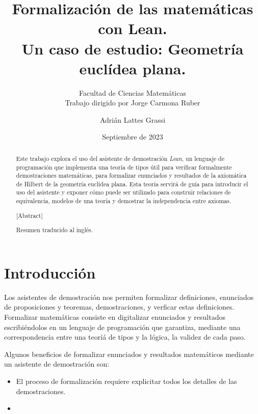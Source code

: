 \documentclass[12pt, spanish]{TFG}
\title{Formalización de las matemáticas con Lean.\\ Un caso de estudio: Geometría euclídea plana.}
\date{Septiembre de 2023}
\author{Adrián Lattes Grassi}
\subtitle{Facultad de Ciencias Matemáticas\\Trabajo dirigido por Jorge Carmona Ruber}
\begin{document}
\maketitle
\emptypage


\begin{abstract}

  Este trabajo explora el uso del asistente de demostración \textit{Lean}, un
  lenguaje de programación que implementa una teoría de tipos útil para
  verificar formalmente demostraciones matemáticas, para formalizar enunciados 
  y resultados de la axiomática de Hilbert de la geometría euclídea plana. Esta
  teoría servirá de guía para introducir el uso del asistente y exponer cómo
  puede ser utilizado para construir relaciones de equivalencia, modelos de
  una teoría y demostrar la independencia entre axiomas.

\end{abstract}

\begin{abstract}[Abstract]

 Resumen traducido al inglés.

\end{abstract}

\newpage



\section*{Introducción}

Los asistentes de demostración nos permiten formalizar definiciones, enunciados
de proposiciones y teoremas, demostraciones, y verficar estas definiciones.
Formalizar matemáticas consiste en digitalizar enunciados y resultados
escribiéndolos en un lenguaje de programación que garantiza, mediante una
correspondencia entre una teoríá de tipos y la lógica, la validez de cada paso.

Algunos beneficios de formalizar enunciados y resultados matemáticos mediante un
asistente de demostración son:

\begin{itemize} 

  \item El proceso de formalización requiere explicitar todos los detalles de
      las demostraciones. 

  \item 

\end{itemize}
\end{document}
